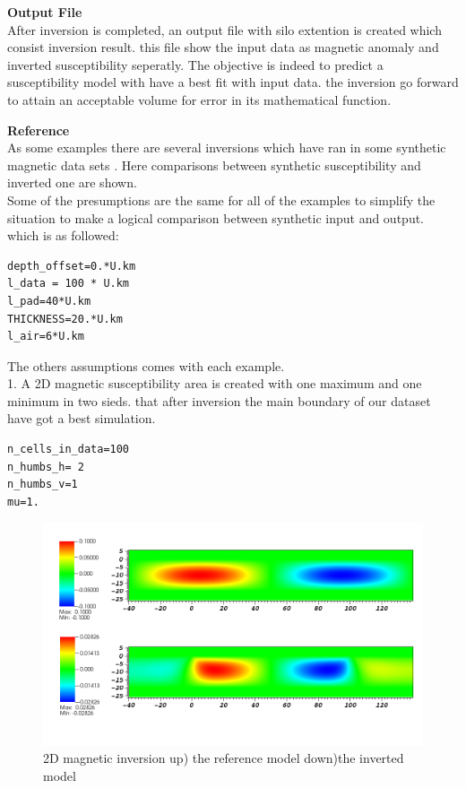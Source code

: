 \textbf{Output File}\\

After inversion is completed, an output file with silo extention is created which consist inversion result. this file show the input data as magnetic anomaly and inverted susceptibility seperatly. The objective is indeed to  predict a susceptibility model with have a best fit with input data. the inversion go forward to attain an acceptable volume for error in its mathematical function. 


\textbf{Reference}\\

As some examples there are several inversions which have ran in some synthetic magnetic data sets . Here comparisons between synthetic susceptibility and inverted one are shown.\\
Some of the presumptions are the same for all of the examples to simplify the situation to make a logical comparison between synthetic input and output. which is as followed:\\
\begin{verbatim}
depth_offset=0.*U.km
l_data = 100 * U.km
l_pad=40*U.km
THICKNESS=20.*U.km
l_air=6*U.km
\end{verbatim}
The others assumptions comes with each example.\\

1. A 2D magnetic susceptibility area is created with one maximum and one minimum in two sieds. that after inversion the main boundary of our dataset  have got a best simulation.\\ 
\begin{verbatim}
n_cells_in_data=100
n_humbs_h= 2
n_humbs_v=1
mu=1.
\end{verbatim}

\begin{figure}
\centering
\includegraphics[width=\textwidth]{mag2D2.png}
\caption{2D magnetic inversion up) the reference model  down)the inverted model}

\end{figure}

